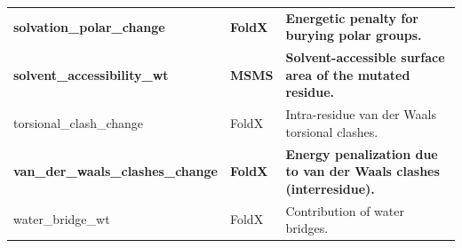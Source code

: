 \begin{table}[tb]
\begin{tabular}{ l | l | p{7cm} }
		\textbf{solvation\_polar\_change}         & \textbf{FoldX}   & \textbf{Energetic penalty for burying polar groups.}                                                \\
		\textbf{solvent\_accessibility\_wt}       & \textbf{MSMS}    & \textbf{Solvent-accessible surface area of the mutated residue.}                                    \\
		torsional\_clash\_change                  & FoldX            & Intra-residue van der Waals torsional clashes.                                                      \\
		\textbf{van\_der\_waals\_clashes\_change} & \textbf{FoldX}   & \textbf{Energy penalization due to van der Waals clashes (interresidue).}                           \\
		water\_bridge\_wt                         & FoldX            & Contribution of water bridges.                                                                      \\
		\bottomrule
	\end{tabular}
\end{table}

